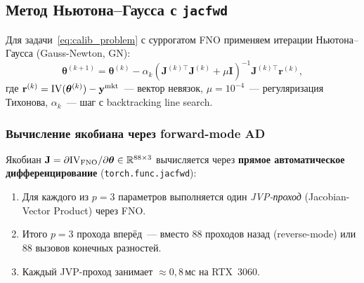 \subsection{Метод Ньютона--Гаусса с \texttt{jacfwd}}
\label{sec:newton}

Для задачи~\eqref{eq:calib_problem} с суррогатом FNO применяем итерации
Ньютона--Гаусса (Gauss-Newton, GN):
\begin{equation}
  \label{eq:newton_step}
  \boldsymbol\theta^{(k+1)}
  = \boldsymbol\theta^{(k)} - \alpha_k
    \left(\mathbf{J}^{(k)\top}\mathbf{J}^{(k)} + \mu\mathbf{I}\right)^{-1}
    \mathbf{J}^{(k)\top}\mathbf{r}^{(k)},
\end{equation}
где $\mathbf{r}^{(k)} = \mathrm{IV}(\boldsymbol\theta^{(k)}) - \mathbf{y}^{\mathrm{mkt}}$~---
вектор невязок, $\mu = 10^{-4}$~--- регуляризация Тихонова,
$\alpha_k$~--- шаг с backtracking line search.

\subsubsection{Вычисление якобиана через forward-mode AD}

Якобиан $\mathbf{J} = \partial\mathrm{IV}_{\mathrm{FNO}}/\partial\boldsymbol\theta \in \mathbb{R}^{88\times 3}$
вычисляется через \textbf{прямое автоматическое дифференцирование}
(\texttt{torch.func.jacfwd}):
\begin{enumerate}
  \item Для каждого из $p=3$ параметров выполняется один \textit{JVP-проход}
        (Jacobian-Vector Product) через FNO.
  \item Итого $p=3$ прохода вперёд~--- вместо $88$ проходов назад
        (reverse-mode) или $88$ вызовов конечных разностей.
  \item Каждый JVP-проход занимает $\approx 0{,}8\,\text{мс}$ на RTX~3060.
\end{enumerate}

